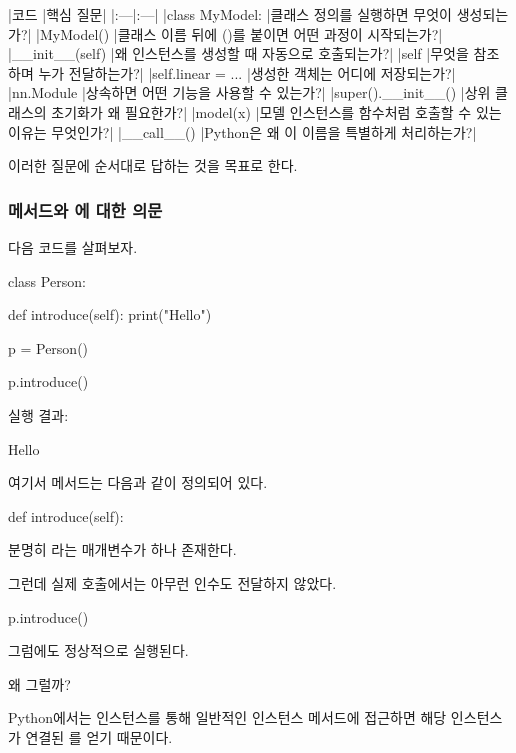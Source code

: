 \begin{dhktable}
|코드	|핵심 질문|
|:---|:---|
|class MyModel:	|클래스 정의를 실행하면 무엇이 생성되는가?|
|MyModel()	|클래스 이름 뒤에 ()를 붙이면 어떤 과정이 시작되는가?|
|__init__(self)	|왜 인스턴스를 생성할 때 자동으로 호출되는가?|
|self	|무엇을 참조하며 누가 전달하는가?|
|self.linear = ...	|생성한 객체는 어디에 저장되는가?|
|nn.Module	|상속하면 어떤 기능을 사용할 수 있는가?|
|super().__init__()	|상위 클래스의 초기화가 왜 필요한가?|
|model(x)	|모델 인스턴스를 함수처럼 호출할 수 있는 이유는 무엇인가?|
|__call__()	|Python은 왜 이 이름을 특별하게 처리하는가?|
\end{dhktable}

이러한 질문에 순서대로 답하는 것을 목표로 한다.

\subsubsection{메서드와 에 대한 의문}

다음 코드를 살펴보자.

\begin{dhkcode}
class Person:

    def introduce(self):
        print("Hello")


p = Person()

p.introduce()
\end{dhkcode}

실행 결과:

\begin{dhkzsh}
Hello
\end{dhkzsh}

여기서  메서드는 다음과 같이 정의되어 있다.

\begin{dhkcode}
def introduce(self):
\end{dhkcode}

분명히 라는 매개변수가 하나 존재한다.

그런데 실제 호출에서는 아무런 인수도 전달하지 않았다.

\begin{dhkcode}
p.introduce()
\end{dhkcode}

그럼에도 정상적으로 실행된다.

왜 그럴까?

Python에서는 인스턴스를 통해 일반적인 인스턴스 메서드에 접근하면 해당 인스턴스가 연결된 를 얻기 때문이다.

